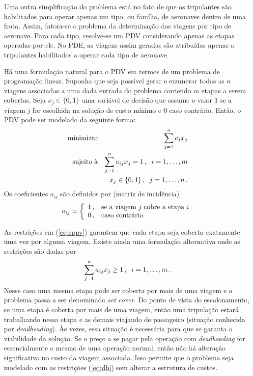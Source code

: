 Uma outra simplificação do problema está no fato de que os tripulantes são habilitados para operar
apenas um tipo, ou família, de aeronaves dentro de uma frota. Assim, fatora-se o problema da
determinação das viagens por tipo de aeronave. Para cada tipo, resolve-se um PDV considerando apenas
as etapas operadas por ele. No PDE, as viagens assim geradas são atribuídas apenas a tripulantes
habilitados a operar cada tipo de aeronave.

Há uma formulação natural para o PDV em termos de um problema de programação linear. Suponha que
seja possível gerar e enumerar todas as $n$ viagens associadas a uma dada entrada do problema
contendo $m$ etapas a serem cobertas. Seja $x_j \in \{0, 1\}$ uma variável de decisão que assume o
valor 1 se a viagem $j$ for escolhida na solução de custo mínimo e 0 caso contrário. Então, o PDV
pode ser modelado da seguinte forma:
%
\begin{eqnarray} \label{eq:sppv}
	\text{minimizar} && \displaystyle \sum_{j=1}^n c_j x_j \nonumber \\
	\text{sujeito à} && \displaystyle \sum_{j=1}^n a_{ij} x_j = 1 \, , \;\; i = 1, \ldots, m \\
		               && x_j \in \{0, 1\} \, , \;\; j = 1, \ldots, n \, . \nonumber
\end{eqnarray} 
%
Os coeficientes $a_{ij}$ são definidos por (matriz de incidência)
%
\begin{equation*}
	a_{ij} = \left\{
	\begin{array}{ll}
			1 \, , & \text{se a viagem $j$ cobre a etapa $i$} \\
			0 \, , & \text{caso contrário}
	\end{array}
	\right.
\end{equation*}

As restrições em (\ref{eq:sppv}) garantem que cada etapa seja coberta exatamente uma vez por alguma
viagem. Existe ainda uma formulação alternativa onde as restrições são dadas por
%
\begin{equation} \label{eq:dh} 
	\sum_{j=1}^n a_{ij} x_j \geq 1 \, , \;\; i = 1, \ldots, m \, .
\end{equation} 
%
Nesse caso uma mesma etapa pode ser coberta por mais de uma viagem e o problema passa a ser
denominado \emph{set cover}. Do ponto de vista do escalonamento, se uma etapa é coberta por mais
de uma viagem, então uma tripulação estará trabalhando nessa etapa e as demais viajando de
passageiro (situação conhecida por \emph{deadheading}). Às vezes, essa situação é necessária para
que se garanta a viabilidade da solução. Se o preço a se pagar pela operação com \emph{deadheading} 
for essencialmente o mesmo de uma operação normal, então não há alteração significativa no custo 
da viagem associada. Isso permite que o problema seja modelado com as restrições (\ref{eq:dh}) 
sem alterar a estrutura de custos.

